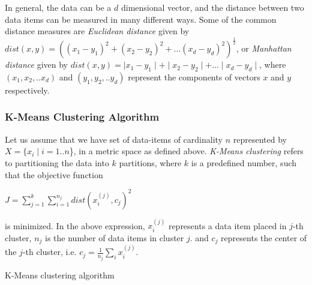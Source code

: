 \noindent
{}
In general, the data can be a $d$ dimensional vector, and the distance between two data items can be measured in many different ways. 
Some of the common distance measures are {\em Euclidean distance} given by 
$dist(x,y) = ((x_1 - y_1)^2 + (x_2 - y_2)^2 + \dots (x_d -y_d)^2)^{\frac{1}{2}}$, 
or {\em Manhattan distance} given by $dist(x,y) = \mid x_1 - y_1 \mid + \mid x_2 - y_2 \mid + \dots \mid x_d - y_d \mid$, 
where $(x_1, x_2, .. x_d)$ and $(y_1, y_2, .. y_d)$ represent the components of vectors $x$ and $y$ respectively.

\subsubsection*{K-Means Clustering Algorithm}

\begin{definition} [K-Means clustering]
	Let us assume that we have set of data-items of cardinality $n$ represented by $X = \{x_i \mid i = 1 .. n$\}, in a metric space 
	as defined above. {\em K-Means clustering} refers to partitioning the data into $k$ partitions, where $k$ is a predefined number, 
	such that the objective function 

	\centerline{
		$J = \sum_{j=1}^k \sum_{i=1}^{n_j} dist(x_i^{(j)}, c_j)^2$
	}

	\noindent
	is minimized. 
	In the above expression, $x_i^{(j)}$ represents a data item placed in $j$-th cluster, $n_j$ is the number of data items in 
	cluster $j$.  and $c_j$ represents the center of the $j$-th cluster, i.e. $c_j = \frac{1}{n_j} \sum_i x_i^{(j)}$. 
\end{definition}


\begin{algorithm}[!htbp]
	\SetAlgoLined
	\DontPrintSemicolon
	\caption{K-Means clustering algorithm}
	\label{algo:bigdata:kmeans}
\end{algorithm}

